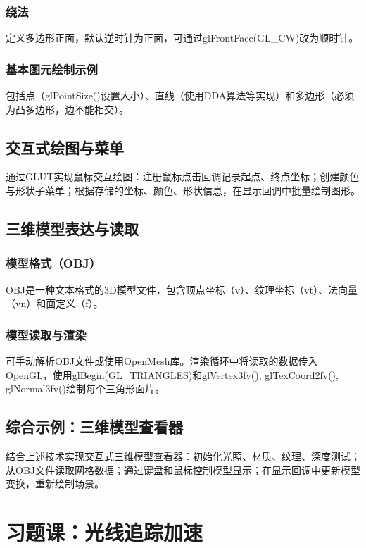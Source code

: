 \documentclass[12pt]{article}
\begin{document}
\subsubsection{绕法}
定义多边形正面，默认逆时针为正面，可通过glFrontFace(GL\_CW)改为顺时针。

\subsubsection{基本图元绘制示例}
包括点（glPointSize()设置大小）、直线（使用DDA算法等实现）和多边形（必须为凸多边形，边不能相交）。

\subsection{交互式绘图与菜单}

通过GLUT实现鼠标交互绘图：注册鼠标点击回调记录起点、终点坐标；创建颜色与形状子菜单；根据存储的坐标、颜色、形状信息，在显示回调中批量绘制图形。

\subsection{三维模型表达与读取}

\subsubsection{模型格式（OBJ）}
OBJ是一种文本格式的3D模型文件，包含顶点坐标（v）、纹理坐标（vt）、法向量（vn）和面定义（f）。

\subsubsection{模型读取与渲染}
可手动解析OBJ文件或使用OpenMesh库。渲染循环中将读取的数据传入OpenGL，使用glBegin(GL\_TRIANGLES)和glVertex3fv(), glTexCoord2fv(), glNormal3fv()绘制每个三角形面片。

\subsection{综合示例：三维模型查看器}
结合上述技术实现交互式三维模型查看器：初始化光照、材质、纹理、深度测试；从OBJ文件读取网格数据；通过键盘和鼠标控制模型显示；在显示回调中更新模型变换，重新绘制场景。

\newpage

\section{习题课：光线追踪加速}
\end{document}
